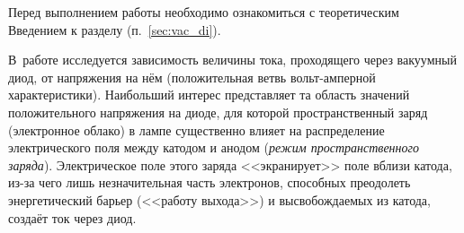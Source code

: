 
Перед выполнением работы необходимо ознакомиться с теоретическим Введением
к разделу (п.~\ref{sec:vac_di}).

%
%

В~работе исследуется зависимость величины тока, проходящего через вакуумный диод,
от напряжения на нём (положительная ветвь вольт-амперной характеристики).
Наибольший интерес представляет та область значений положительного напряжения
на диоде, для которой пространственный заряд (электронное облако) в лампе 
существенно влияет на распределение электрического поля между катодом и анодом
(\emph{режим пространственного заряда}). Электрическое поле этого заряда
<<экранирует>> поле вблизи катода, из-за чего 
лишь незначительная часть электронов, способных преодолеть энергетический барьер
(<<работу выхода>>) и высвобождаемых из катода, создаёт ток через диод.

